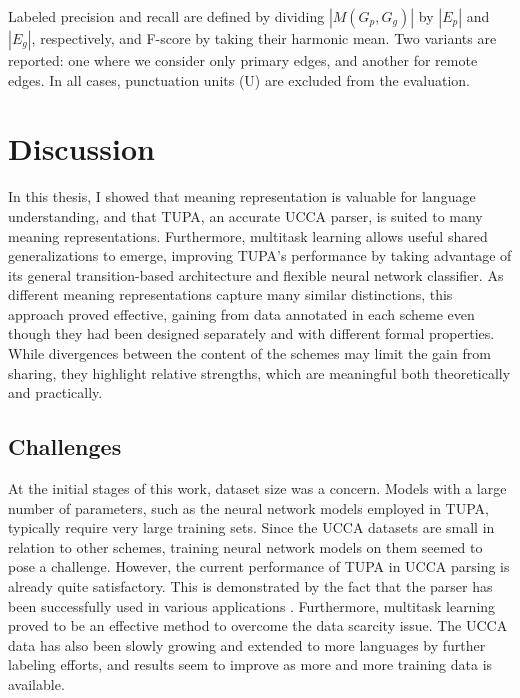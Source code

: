 \documentclass[12pt,a4paper,table]{report}
\renewcommand\cite{\citep}      %
\begin{document}
Labeled precision and recall are defined by dividing $|M(G_p,G_g)|$ by $|E_p|$ and $|E_g|$, respectively,
and F-score by taking their harmonic mean.
Two variants are reported: one where we consider only primary edges,
and another for remote edges.
In all cases, punctuation units (U) are excluded from the evaluation.









\chapter{Discussion}

In this thesis, I showed that meaning representation is valuable for language understanding,
and that TUPA, an accurate UCCA parser, is suited to many meaning representations.
Furthermore, multitask learning allows useful shared generalizations to emerge,
improving TUPA's performance by taking advantage of its general transition-based
architecture and flexible neural network classifier.
As different meaning representations capture many similar distinctions,
this approach proved effective, gaining from data annotated in each scheme
even though they had been designed separately and with different formal properties.
While divergences between the content of the schemes may limit the gain from sharing,
they highlight relative strengths, which are meaningful both theoretically and practically.

\section*{Challenges}

At the initial stages of this work, dataset size was a concern.
Models with a large number of parameters,
such as the neural network models employed in TUPA,
typically require very large training sets.
Since the UCCA datasets are small in relation to other schemes,
training neural network models on them seemed to pose a challenge.
However,
the current performance of TUPA in UCCA parsing is already quite satisfactory.
This is demonstrated by the fact that the parser has been successfully used in
various applications \cite{choshen2018reference,sulem2018semantic,sulem2018simple}.
Furthermore,
multitask learning proved to be an effective method to overcome the data scarcity issue.
The UCCA data has also been slowly growing and extended to more languages by further labeling efforts,
and results seem to improve as more and more training data is available.
\end{document}

